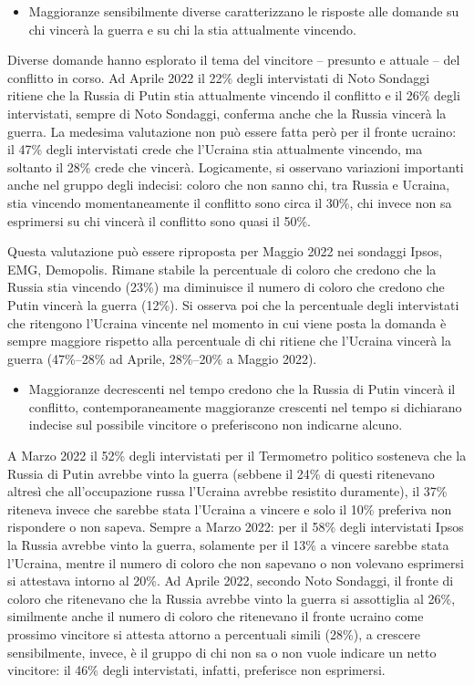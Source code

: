 \documentclass[
  openany]{book}
\providecommand{\tightlist}{%
  \setlength{\itemsep}{0pt}\setlength{\parskip}{0pt}}
\begin{document}
\begin{itemize}
\tightlist
\item
  Maggioranze sensibilmente diverse caratterizzano le risposte alle domande su chi vincerà la guerra e su chi la stia attualmente vincendo.
\end{itemize}

Diverse domande hanno esplorato il tema del vincitore -- presunto e attuale -- del conflitto in corso. Ad Aprile 2022 il 22\% degli intervistati di Noto Sondaggi ritiene che la Russia di Putin stia attualmente vincendo il conflitto e il 26\% degli intervistati, sempre di Noto Sondaggi, conferma anche che la Russia vincerà la guerra. La medesima valutazione non può essere fatta però per il fronte ucraino: il 47\% degli intervistati crede che l'Ucraina stia attualmente vincendo, ma soltanto il 28\% crede che vincerà. Logicamente, si osservano variazioni importanti anche nel gruppo degli indecisi: coloro che non sanno chi, tra Russia e Ucraina, stia vincendo momentaneamente il conflitto sono circa il 30\%, chi invece non sa esprimersi su chi vincerà il conflitto sono quasi il 50\%.

Questa valutazione può essere riproposta per Maggio 2022 nei sondaggi Ipsos, EMG, Demopolis. Rimane stabile la percentuale di coloro che credono che la Russia stia vincendo (23\%) ma diminuisce il numero di coloro che credono che Putin vincerà la guerra (12\%). Si osserva poi che la percentuale degli intervistati che ritengono l'Ucraina vincente nel momento in cui viene posta la domanda è sempre maggiore rispetto alla percentuale di chi ritiene che l'Ucraina vincerà la guerra (47\%--28\% ad Aprile, 28\%--20\% a Maggio 2022).

\begin{itemize}
\tightlist
\item
  Maggioranze decrescenti nel tempo credono che la Russia di Putin vincerà il conflitto, contemporaneamente maggioranze crescenti nel tempo si dichiarano indecise sul possibile vincitore o preferiscono non indicarne alcuno.
\end{itemize}

A Marzo 2022 il 52\% degli intervistati per il Termometro politico sosteneva che la Russia di Putin avrebbe vinto la guerra (sebbene il 24\% di questi ritenevano altresì che all'occupazione russa l'Ucraina avrebbe resistito duramente), il 37\% riteneva invece che sarebbe stata l'Ucraina a vincere e solo il 10\% preferiva non rispondere o non sapeva. Sempre a Marzo 2022: per il 58\% degli intervistati Ipsos la Russia avrebbe vinto la guerra, solamente per il 13\% a vincere sarebbe stata l'Ucraina, mentre il numero di coloro che non sapevano o non volevano esprimersi si attestava intorno al 20\%. Ad Aprile 2022, secondo Noto Sondaggi, il fronte di coloro che ritenevano che la Russia avrebbe vinto la guerra si assottiglia al 26\%, similmente anche il numero di coloro che ritenevano il fronte ucraino come prossimo vincitore si attesta attorno a percentuali simili (28\%), a crescere sensibilmente, invece, è il gruppo di chi non sa o non vuole indicare un netto vincitore: il 46\% degli intervistati, infatti, preferisce non esprimersi.
\end{document}
